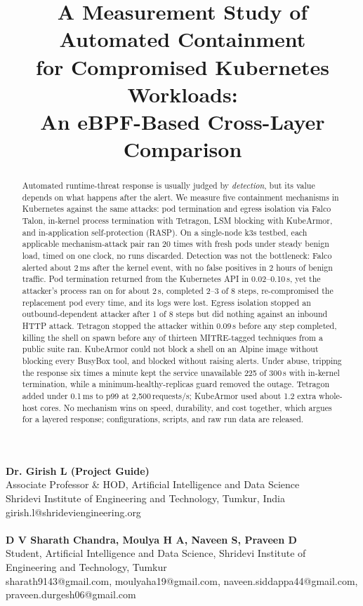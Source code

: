 \documentclass[10pt,conference]{IEEEtran}
\begin{document}
\title{A Measurement Study of Automated Containment\\for Compromised Kubernetes Workloads:\\An eBPF-Based Cross-Layer Comparison}

\author{}

\maketitle
\begin{center}
\textbf{Dr. Girish L \quad (Project Guide)} \\
Associate Professor \& HOD, Artificial Intelligence and Data Science \\
Shridevi Institute of Engineering and Technology, Tumkur, India \\
girish.l@shrideviengineering.org \\ \quad \\
\textbf{D V Sharath Chandra, Moulya H A, Naveen S, Praveen D} \\
Student, Artificial Intelligence and Data Science, Shridevi Institute of Engineering and Technology, Tumkur \\
sharath9143@gmail.com, moulyaha19@gmail.com, naveen.siddappa44@gmail.com, praveen.durgesh06@gmail.com
\end{center}

\begin{abstract}
Automated runtime-threat response is usually judged by \emph{detection}, but its value depends on what happens after the alert. We measure five containment mechanisms in Kubernetes against the same attacks: pod termination and egress isolation via Falco Talon, in-kernel process termination with Tetragon, LSM blocking with KubeArmor, and in-application self-protection (RASP). On a single-node k3s testbed, each applicable mechanism-attack pair ran 20 times with fresh pods under steady benign load, timed on one clock, no runs discarded. Detection was not the bottleneck: Falco alerted about 2\,ms after the kernel event, with no false positives in 2 hours of benign traffic. Pod termination returned from the Kubernetes API in 0.02--0.10\,s, yet the attacker's process ran on for about 2\,s, completed 2--3 of 8 steps, re-compromised the replacement pod every time, and its logs were lost. Egress isolation stopped an outbound-dependent attacker after 1 of 8 steps but did nothing against an inbound HTTP attack. Tetragon stopped the attacker within 0.09\,s before any step completed, killing the shell on spawn before any of thirteen MITRE-tagged techniques from a public suite ran. KubeArmor could not block a shell on an Alpine image without blocking every BusyBox tool, and blocked without raising alerts. Under abuse, tripping the response six times a minute kept the service unavailable 225 of 300\,s with in-kernel termination, while a minimum-healthy-replicas guard removed the outage. Tetragon added under 0.1\,ms to p99 at 2{,}500\,requests/s; KubeArmor used about 1.2 extra whole-host cores. No mechanism wins on speed, durability, and cost together, which argues for a layered response; configurations, scripts, and raw run data are released.
\end{abstract}
\end{document}
